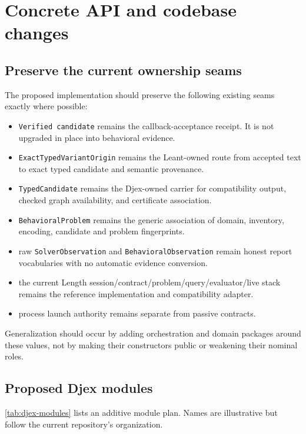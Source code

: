 \documentclass[11pt,oneside]{report}
\newcommand{\code}[1]{\texttt{#1}}
\begin{document}
\chapter{Concrete API and codebase changes}
\label{chap:api}

\section{Preserve the current ownership seams}

The proposed implementation should preserve the following existing seams exactly where possible:

\begin{itemize}[leftmargin=2em]
\item \code{Verified candidate} remains the callback-acceptance receipt. It is not upgraded in place into behavioral evidence.
\item \code{ExactTypedVariantOrigin} remains the Leant-owned route from accepted text to exact typed candidate and semantic provenance.
\item \code{TypedCandidate} remains the Djex-owned carrier for compatibility output, checked graph availability, and certificate association.
\item \code{BehavioralProblem} remains the generic association of domain, inventory, encoding, candidate and problem fingerprints.
\item raw \code{SolverObservation} and \code{BehavioralObservation} remain honest report vocabularies with no automatic evidence conversion.
\item the current Length session/contract/problem/query/evaluator/live stack remains the reference implementation and compatibility adapter.
\item process launch authority remains separate from passive contracts.
\end{itemize}

Generalization should occur by adding orchestration and domain packages around these values, not by making their constructors public or weakening their nominal roles.

\section{Proposed Djex modules}

\cref{tab:djex-modules} lists an additive module plan. Names are illustrative but follow the current repository's organization.
\end{document}
